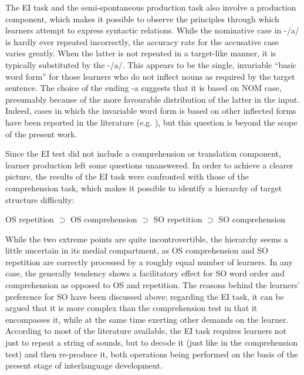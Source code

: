 The EI task and the semi-spontaneous production task also involve a production component, which makes it possible to observe the principles through which learners attempt to express syntactic relations. While the nominative case in -/a/ is hardly ever repeated incorrectly, the accuracy rate for the accusative case varies greatly. When the latter is not repeated in a target-like manner, it is typically substituted by the -/a/. This appears to be the single, invariable “basic word form” \citep{Perdue1993} for those learners who do not inflect nouns as required by the target sentence. The choice of the ending -a suggests that it is based on NOM case, presumably because of the more favourable distribution of the latter in the input. Indeed, cases in which the invariable word form is based on other inflected forms have been reported in the literature (e.g. \citealt{BroederEtAl1993, GarðarsdóttirÞorvaldsdóttirInPrep}), but this question is beyond the scope of the present work.  

Since the EI test did not include a comprehension or translation component, learner production left some questions unanswered. In order to achieve a clearer picture, the results of the EI task were confronted with those of the comprehension task, which makes it possible to identify a hierarchy of target structure difficulty:

OS repetition ${\supset}$ OS comprehension ${\supset}$ SO repetition ${\supset}$ SO comprehension 

While the two extreme points are quite incontrovertible, the hierarchy seems a little uncertain in its medial compartment, as OS comprehension and SO repetition are correctly processed by a roughly equal number of learners. In any case, the generally tendency shows a facilitatory effect for SO word order and comprehension as opposed to OS and repetition. The reasons behind the learners’ preference for SO have been discussed above; regarding the EI task, it can be argued that it is more complex than the comprehension test in that it encompasses it, while at the same time exerting other demands on the learner. According to most of the literature available, the EI task requires learners not just to repeat a string of sounds, but to decode it (just like in the comprehension test) and then re-produce it, both operations being performed on the basis of the present stage of interlanguage development. 

